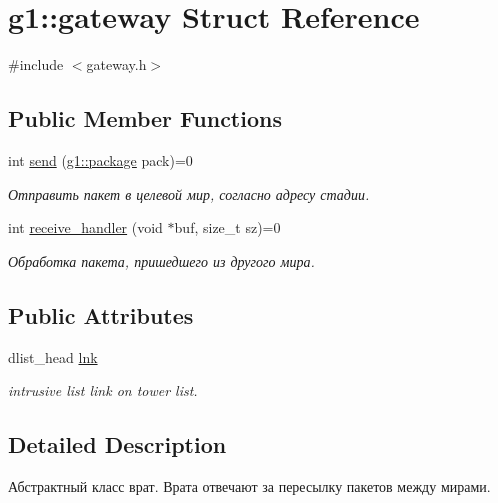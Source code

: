 \hypertarget{structg1_1_1gateway}{}\section{g1\+:\+:gateway Struct Reference}
\label{structg1_1_1gateway}


{\ttfamily \#include $<$gateway.\+h$>$}

\subsection*{Public Member Functions}
\begin{DoxyCompactItemize}
\item 
int \hyperlink{structg1_1_1gateway_abf8bda3d6c126eddf0f81984096be2d6}{send} (\hyperlink{structg1_1_1package}{g1\+::package} pack)=0
\begin{DoxyCompactList}\small\item\em Отправить пакет в целевой мир, согласно адресу стадии. \end{DoxyCompactList}\item 
int \hyperlink{structg1_1_1gateway_a2d8892e9c42ab223c4e1c9ab75080b93}{receive\+\_\+handler} (void $\ast$buf, size\+\_\+t sz)=0
\begin{DoxyCompactList}\small\item\em Обработка пакета, пришедшего из другого мира. \end{DoxyCompactList}\end{DoxyCompactItemize}
\subsection*{Public Attributes}
\begin{DoxyCompactItemize}
\item 
dlist\+\_\+head \hyperlink{structg1_1_1gateway_a9b30f9f8c97681eb9b8ce01594200916}{lnk}\hypertarget{structg1_1_1gateway_a9b30f9f8c97681eb9b8ce01594200916}{}\label{structg1_1_1gateway_a9b30f9f8c97681eb9b8ce01594200916}

\begin{DoxyCompactList}\small\item\em intrusive list link on tower list. \end{DoxyCompactList}\end{DoxyCompactItemize}


\subsection{Detailed Description}
Абстрактный класс врат. Врата отвечают за пересылку пакетов между мирами. 

